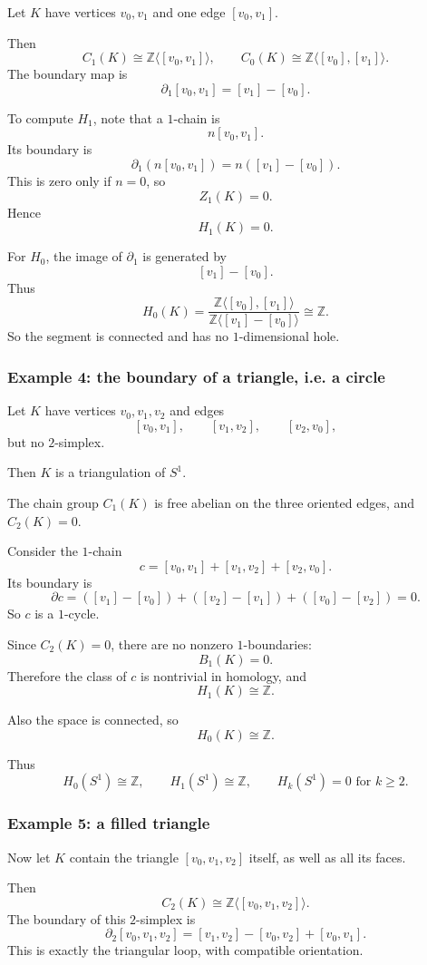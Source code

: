 \documentclass[12pt,a4paper]{article}
\theoremstyle{notespace}
\begin{document}
Let \(K\) have vertices \(v_0,v_1\) and one edge \([v_0,v_1]\).

Then
\[
C_1(K)\cong \mathbb{Z}\langle [v_0,v_1]\rangle,
\qquad
C_0(K)\cong \mathbb{Z}\langle [v_0],[v_1]\rangle.
\]
The boundary map is
\[
\partial_1[v_0,v_1]=[v_1]-[v_0].
\]

To compute \(H_1\), note that a \(1\)-chain is
\[
n[v_0,v_1].
\]
Its boundary is
\[
\partial_1(n[v_0,v_1])=n([v_1]-[v_0]).
\]
This is zero only if \(n=0\), so
\[
Z_1(K)=0.
\]
Hence
\[
H_1(K)=0.
\]

For \(H_0\), the image of \(\partial_1\) is generated by
\[
[v_1]-[v_0].
\]
Thus
\[
H_0(K)
=
\frac{\mathbb{Z}\langle [v_0],[v_1]\rangle}
{\mathbb{Z}\langle [v_1]-[v_0]\rangle}
\cong \mathbb{Z}.
\]
So the segment is connected and has no \(1\)-dimensional hole.

\subsubsection{Example 4: the boundary of a triangle, i.e. a circle}

Let \(K\) have vertices \(v_0,v_1,v_2\) and edges
\[
[v_0,v_1],\qquad [v_1,v_2],\qquad [v_2,v_0],
\]
but no \(2\)-simplex.

Then \(K\) is a triangulation of \(S^1\).

The chain group \(C_1(K)\) is free abelian on the three oriented edges, and \(C_2(K)=0\).

Consider the \(1\)-chain
\[
c=[v_0,v_1]+[v_1,v_2]+[v_2,v_0].
\]
Its boundary is
\[
\partial c
=
([v_1]-[v_0]) + ([v_2]-[v_1]) + ([v_0]-[v_2]) = 0.
\]
So \(c\) is a \(1\)-cycle.

Since \(C_2(K)=0\), there are no nonzero \(1\)-boundaries:
\[
B_1(K)=0.
\]
Therefore the class of \(c\) is nontrivial in homology, and
\[
H_1(K)\cong \mathbb{Z}.
\]

Also the space is connected, so
\[
H_0(K)\cong \mathbb{Z}.
\]

Thus
\[
H_0(S^1)\cong \mathbb{Z},
\qquad
H_1(S^1)\cong \mathbb{Z},
\qquad
H_k(S^1)=0 \text{ for } k\ge 2.
\]

\subsubsection{Example 5: a filled triangle}

Now let \(K\) contain the triangle \([v_0,v_1,v_2]\) itself, as well as all its faces.

Then
\[
C_2(K)\cong \mathbb{Z}\langle [v_0,v_1,v_2]\rangle.
\]
The boundary of this \(2\)-simplex is
\[
\partial_2[v_0,v_1,v_2]
=
[v_1,v_2]-[v_0,v_2]+[v_0,v_1].
\]
This is exactly the triangular loop, with compatible orientation.
\end{document}
